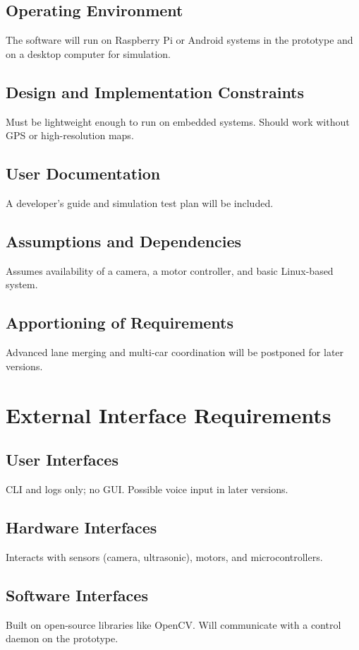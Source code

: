 \documentclass[12pt]{article}
\begin{document}
\subsection{Operating Environment}
The software will run on Raspberry Pi or Android systems in the prototype and on a desktop computer for simulation.

\subsection{Design and Implementation Constraints}
Must be lightweight enough to run on embedded systems. Should work without GPS or high-resolution maps.

\subsection{User Documentation}
A developer's guide and simulation test plan will be included.

\subsection{Assumptions and Dependencies}
Assumes availability of a camera, a motor controller, and basic Linux-based system.

\subsection{Apportioning of Requirements}
Advanced lane merging and multi-car coordination will be postponed for later versions.

\section{External Interface Requirements}
\subsection{User Interfaces}
CLI and logs only; no GUI. Possible voice input in later versions.

\subsection{Hardware Interfaces}
Interacts with sensors (camera, ultrasonic), motors, and microcontrollers.

\subsection{Software Interfaces}
Built on open-source libraries like OpenCV. Will communicate with a control daemon on the prototype.
\end{document}
